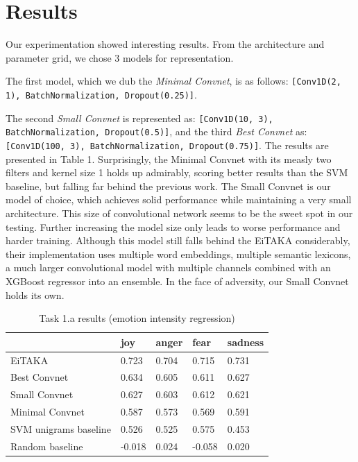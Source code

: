 \documentclass[10pt, a4paper]{article}
\begin{document}
\section{Results}
Our experimentation showed interesting results. 
From the architecture and parameter grid, we chose 3 models for representation.

The first model, which we dub the \textit{Minimal Convnet}, is as follows:
\texttt{[Conv1D(2, 1), BatchNormalization, Dropout(0.25)]}.

The second \textit{Small Convnet} is represented as: 
\texttt{[Conv1D(10, 3), BatchNormalization, Dropout(0.5)]}, and the third 
\textit{Best Convnet} as: 
\texttt{[Conv1D(100, 3), BatchNormalization, Dropout(0.75)]}.
The results are presented in Table 1.
Surprisingly, the Minimal Convnet with its measly two filters 
and kernel size 1 holds up admirably, scoring
better results than the SVM baseline, but falling far behind the 
previous work.
The Small Convnet is our model of choice, which achieves solid 
performance while maintaining a very small architecture.
This size of convolutional network seems to be the sweet spot in our testing.
Further increasing the model size only leads to worse performance and 
harder training.
Although this model still falls behind the EiTAKA considerably, their
implementation uses multiple word embeddings, multiple semantic lexicons,
a much larger convolutional model with multiple channels combined with an
XGBoost regressor into an ensemble.
In the face of adversity, our Small Convnet holds its own.


\begin{table}
\caption{Task 1.a results (emotion intensity regression)}
\label{tab:narrow-table}
\begin{center}
\begin{tabular}{lllll}
\toprule
& joy & anger & fear & sadness \\
\midrule
EiTAKA    & 0.723  & 0.704 & 0.715 & 0.731 \\
Best Convnet & 0.634 & 0.605 & 0.611 & 0.627 \\
Small Convnet & 0.627 & 0.603 & 0.612 & 0.621 \\
Minimal Convnet & 0.587 & 0.573 & 0.569 & 0.591 \\
SVM unigrams baseline & 0.526 & 0.525 & 0.575 & 0.453 \\
Random baseline & -0.018 & 0.024 & -0.058 & 0.020 \\
\bottomrule
\end{tabular}
\end{center}
\end{table}
\end{document}
